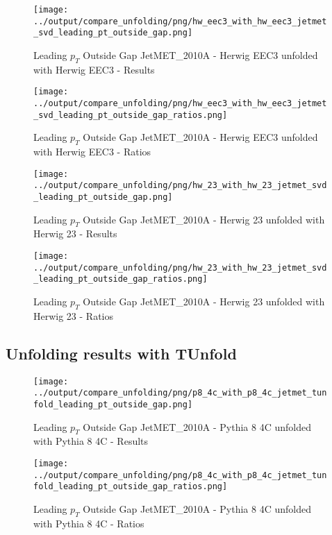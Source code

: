 \documentclass[11pt]{book}
\begin{document}
\begin{figure}[ht]
\centering
\texttt{[image: ../output/compare\_unfolding/png/hw\_eec3\_with\_hw\_eec3\_jetmet\_svd\_leading\_pt\_outside\_gap.png]}
\caption{Leading $p_{T}$ Outside Gap JetMET\_2010A - Herwig EEC3 unfolded with Herwig EEC3 - Results}
\label{hw_eec3_hw_eec3_jetmet_svd_leading_pt_outside_gap_a}
\end{figure}

\begin{figure}[ht]
\centering
\texttt{[image: ../output/compare\_unfolding/png/hw\_eec3\_with\_hw\_eec3\_jetmet\_svd\_leading\_pt\_outside\_gap\_ratios.png]}
\caption{Leading $p_{T}$ Outside Gap JetMET\_2010A - Herwig EEC3 unfolded with Herwig EEC3 - Ratios}
\label{hw_eec3_hw_eec3_jetmet_svd_leading_pt_outside_gap_b}
\end{figure}

\begin{figure}[ht]
\centering
\texttt{[image: ../output/compare\_unfolding/png/hw\_23\_with\_hw\_23\_jetmet\_svd\_leading\_pt\_outside\_gap.png]}
\caption{Leading $p_{T}$ Outside Gap JetMET\_2010A - Herwig 23 unfolded with Herwig 23 - Results}
\label{hw_23_hw_23_jetmet_svd_leading_pt_outside_gap_a}
\end{figure}

\begin{figure}[ht]
\centering
\texttt{[image: ../output/compare\_unfolding/png/hw\_23\_with\_hw\_23\_jetmet\_svd\_leading\_pt\_outside\_gap\_ratios.png]}
\caption{Leading $p_{T}$ Outside Gap JetMET\_2010A - Herwig 23 unfolded with Herwig 23 - Ratios}
\label{hw_23_hw_23_jetmet_svd_leading_pt_outside_gap_b}
\end{figure}


\clearpage
\subsection{Unfolding results with TUnfold}

\begin{figure}[ht]
\centering
\texttt{[image: ../output/compare\_unfolding/png/p8\_4c\_with\_p8\_4c\_jetmet\_tunfold\_leading\_pt\_outside\_gap.png]}
\caption{Leading $p_{T}$ Outside Gap JetMET\_2010A - Pythia 8 4C unfolded with Pythia 8 4C - Results}
\label{p8_p8_jetmet_tunfold_leading_pt_outside_gap_a}
\end{figure}

\begin{figure}[ht]
\centering
\texttt{[image: ../output/compare\_unfolding/png/p8\_4c\_with\_p8\_4c\_jetmet\_tunfold\_leading\_pt\_outside\_gap\_ratios.png]}
\caption{Leading $p_{T}$ Outside Gap JetMET\_2010A - Pythia 8 4C unfolded with Pythia 8 4C - Ratios}
\label{p8_p8_jetmet_tunfold_leading_pt_outside_gap_b}
\end{figure}
\end{document}
